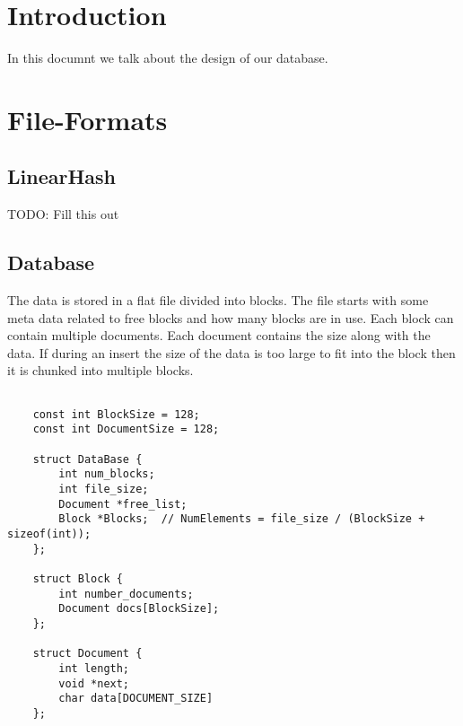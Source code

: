 \documentclass{article}
\begin{document}
\section{Introduction}

In this documnt we talk about the design of our database.

\section{File-Formats}

\subsection{LinearHash}

TODO: Fill this out


\subsection{Database}

The data is stored in a flat file divided into blocks.
The file starts with some meta data related to free blocks and how many blocks are in use.
Each block can contain multiple documents.
Each document contains the size along with the data.
If during an insert the size of the data is too large to fit into the block then it is chunked into multiple blocks.

\begin{verbatim}

    const int BlockSize = 128;
    const int DocumentSize = 128;

    struct DataBase {
        int num_blocks;
        int file_size;
        Document *free_list;
        Block *Blocks;  // NumElements = file_size / (BlockSize + sizeof(int));
    };

    struct Block {
        int number_documents;
        Document docs[BlockSize];
    };

    struct Document {
        int length;
        void *next;
        char data[DOCUMENT_SIZE]
    };

\end{verbatim}
\end{document}
